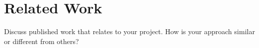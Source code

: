 \section{Related Work} 
Discuss published work that relates to your project. How
is your approach similar or different from others?